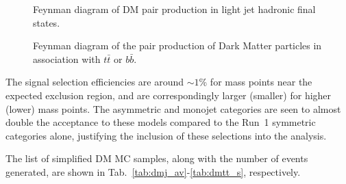 \begin{figure}[h!] \centering
  \caption{Feynman diagram of DM pair production in light jet hadronic final states. \cite{Abercrombie:2015wmb}}
  \label{fig:DMfeynman} 
\end{figure}

\begin{figure}[h!] \centering
  \caption{Feynman diagram of the pair production of Dark Matter particles in
  association with $t\bar{t}$ or $b\bar{b}$. \cite{Abercrombie:2015wmb}}
  \label{fig:feynman_hf}
\end{figure}

The signal selection efficiencies are around $\sim 1$\% for mass points near the expected exclusion
region, and are correspondingly larger (smaller) for higher (lower) mass points.
The asymmetric and monojet categories are seen to almost double the acceptance
to these models compared to the Run~1 symmetric categories alone, justifying the
inclusion of these selections into the analysis.

The list of simplified DM MC samples, along with the number of events 
generated, are shown in Tab.~\ref{tab:dmj_av}-\ref{tab:dmtt_s}, respectively.

